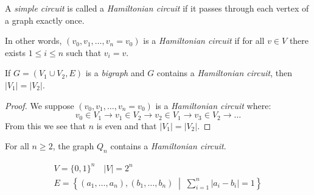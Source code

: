 \documentclass[00_complete]{subfiles}
\begin{document}
\begin{definition}
    A \emph{simple circuit} is called a \emph{Hamiltonian circuit} if it passes
    through each vertex of a graph exactly once.

    In other words, $(v_0,v_1,\dots,v_n=v_0)$ is a \emph{Hamiltonian circuit} if
    for all $v \in V$ there exists $1\leq i \leq n$ such that $v_i=v$.
\end{definition}
\begin{claim}
    If $G=(V_1\cup V_2,E)$ is a \emph{bigraph} and $G$ contains a
    \emph{Hamiltonian circuit}, then $|V_1|=|V_2|$.
\end{claim}
\begin{proof}
    We suppose $(v_0,v_1,\dots,v_n=v_0)$ is a \emph{Hamiltonian circuit} where:
    $$v_0 \in V_1 \to v_1 \in V_2 \to v_2 \in V_1 \to v_3 \in V_2 \to\dots$$
    From this we see that $n$ is even and that $|V_1|=|V_2|$.
\end{proof}
\begin{claim}
    For all $n\geq 2$, the graph $Q_n$ contains a \emph{Hamiltonian circuit}.
\end{claim}
\begin{definition}
    \begin{gather*}
    V=\{0,1\}^n \quad |V|=2^n \\
    E=\left\{(a_1,\dots,a_n),(b_1,\dots,b_n) \;\middle|\; \sum_{i=1}^{n}|a_i-b_i|=1\right\}
    \end{gather*}
\end{definition}
\end{document}
